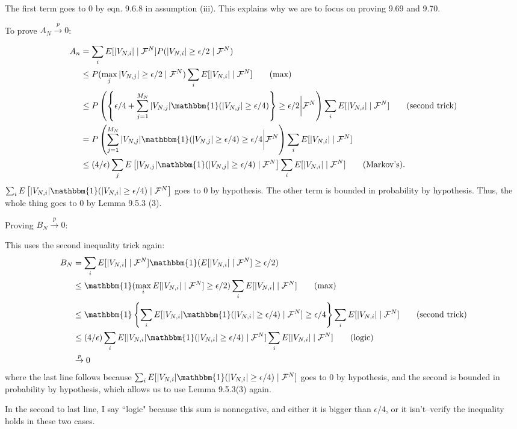 \documentclass{article}
\begin{document}
The first term goes to $0$ by eqn. 9.6.8 in assumption (iii). This explains why we are to focus on proving 9.69 and 9.70. 
\newline

To prove $A_N \overset{p}{\to} 0$: 

\begin{align*}
A_n &= \sum_i E[ | V_{N,i}|  \mid \mathcal{F}^N] P(|V_{N,i}| \ge \epsilon/2 \mid \mathcal{F}^N ) \\
&\le P(\max_j |V_{N,j}| \ge \epsilon/2 \mid \mathcal{F}^N ) \sum_i E[ | V_{N,i}|  \mid \mathcal{F}^N] \tag{max} \\
&\le P\left( \left\{ \epsilon/4 + \sum_{j=1}^{M_N} |V_{N,j}| \mathbbm{1}(|V_{N,j}| \ge \epsilon/4) \right\}  \ge \epsilon/2 \bigg\rvert \mathcal{F}^N \right) \sum_i E[ | V_{N,i}|  \mid \mathcal{F}^N]  \tag{second trick} \\
&= P\left( \sum_{j=1}^{M_N} |V_{N,j}| \mathbbm{1}(|V_{N,j}| \ge \epsilon/4)   \ge \epsilon/4 \bigg\rvert \mathcal{F}^N \right) \sum_i E[ | V_{N,i}|  \mid \mathcal{F}^N]   \\
&\le (4/ \epsilon) \sum_j E\left[ |V_{N,j}| \mathbbm{1}(|V_{N,j}| \ge \epsilon/4) \mid \mathcal{F}^N \right]  \sum_i E[ | V_{N,i}|  \mid \mathcal{F}^N]  \tag{Markov's}.
\end{align*}
$\sum_i E\left[ |V_{N,i}| \mathbbm{1}(|V_{N,i}| \ge \epsilon/4) \mid \mathcal{F}^N \right]$ goes to $0$ by hypothesis. The other term is bounded in probability by hypothesis. Thus, the whole thing goes to $0$ by Lemma 9.5.3 (3).

Proving $B_N \overset{p}{\to} 0$: 
\newline

This uses the second inequality trick again:
\begin{align*}
B_N &=   \sum_i E[ | V_{N,i}|  \mid \mathcal{F}^N]  \mathbbm{1}( E[|V_{N,i}| \mid \mathcal{F}^N ] \ge \epsilon/2) \\
&\le  \mathbbm{1}( \max_i E[|V_{N,i}| \mid \mathcal{F}^N ] \ge \epsilon/2) \sum_i E[ | V_{N,i}|  \mid \mathcal{F}^N] \tag{max} \\
&\le  \mathbbm{1} \left\{ \sum_i E[|V_{N,i}| \mathbbm{1}(| V_{N,i} |\ge \epsilon/4) \mid \mathcal{F}^N ] \ge \epsilon/4 \right\}\sum_i E[ | V_{N,i}|  \mid \mathcal{F}^N]  \tag{second trick} \\
&\le (4/\epsilon) \sum_i E[|V_{N,i}| \mathbbm{1}(| V_{N,i} |\ge \epsilon/4) \mid \mathcal{F}^N ]  \sum_i E[ | V_{N,i}|  \mid \mathcal{F}^N] \tag{logic} \\
&\overset{p}{\to} 0
\end{align*}
where the last line follows because $\sum_i E[|V_{N,i}| \mathbbm{1}(| V_{N,i} |\ge \epsilon/4) \mid \mathcal{F}^N ]$ goes to $0$ by hypothesis, and the second is bounded in probability by hypothesis, which allows us to use Lemma 9.5.3(3) again. 

In the second to last line, I say ``logic" because this sum is nonnegative, and either it is bigger than $\epsilon/4$, or it isn't--verify the inequality holds in these two cases. 
\end{document}
